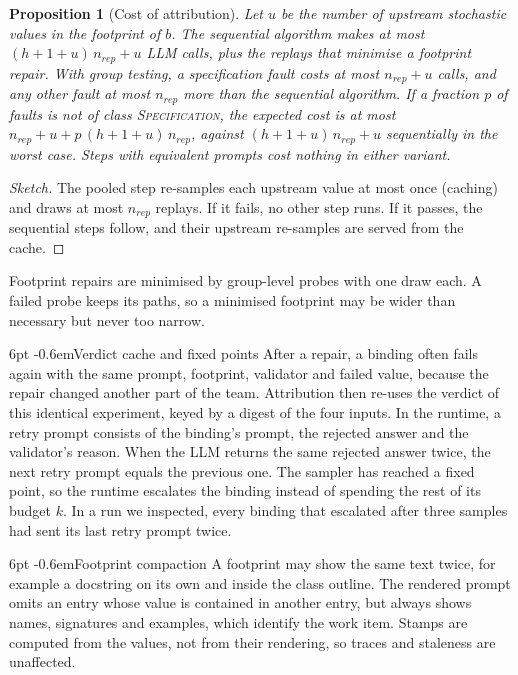 \documentclass[pdflatex,sn-mathphys-num]{sn-jnl}
\makeatletter
\theoremstyle{thmstyleone}%
\newtheorem{proposition}[theorem]{Proposition}%
\theoremstyle{thmstyletwo}%
\theoremstyle{thmstylethree}%
\renewcommand\paragraph{\@startsection{paragraph}{4}{\z@}%
  {6pt \@plus 2pt \@minus 1pt}{-0.6em}{\normalfont\normalsize\bfseries}}
\makeatother
\begin{document}
\begin{proposition}[Cost of attribution]\label{prop:attrcost}
Let $u$ be the number of upstream stochastic values in the footprint of $b$.
The sequential algorithm makes at most $(h+1+u)\,n_{\mathit{rep}}+u$ LLM calls,
plus the replays that minimise a footprint repair. With group testing, a
specification fault costs at most $n_{\mathit{rep}}+u$ calls, and any other
fault at most $n_{\mathit{rep}}$ more than the sequential algorithm. If a
fraction $p$ of faults is not of class \textsc{Specification}, the expected cost
is at most $n_{\mathit{rep}}+u+p\,(h+1+u)\,n_{\mathit{rep}}$, against
$(h+1+u)\,n_{\mathit{rep}}+u$ sequentially in the worst case. Steps with
equivalent prompts cost nothing in either variant.
\end{proposition}
\begin{proof}[Sketch]
The pooled step re-samples each upstream value at most once (caching) and draws
at most $n_{\mathit{rep}}$ replays. If it fails, no other step runs. If it
passes, the sequential steps follow, and their upstream re-samples are served
from the cache.
\end{proof}

Footprint repairs are minimised by group-level probes with one draw each. A
failed probe keeps its paths, so a minimised footprint may be wider than
necessary but never too narrow.

\paragraph{Verdict cache and fixed points} After a repair, a binding often fails
again with the same prompt, footprint, validator and failed value, because the
repair changed another part of the team. Attribution then re-uses the verdict
of this identical experiment, keyed by a digest of the four inputs. In the
runtime, a retry prompt consists of the binding's prompt, the rejected answer
and the validator's reason. When the LLM returns the same rejected answer
twice, the next retry prompt equals the previous one. The sampler has reached a
fixed point, so the runtime escalates the binding instead of spending the rest
of its budget $k$. In a run we inspected,
every binding that escalated after three samples had sent its last retry prompt twice.

\paragraph{Footprint compaction} A footprint may show the same text twice, for
example a docstring on its own and inside the class outline. The rendered
prompt omits an entry whose value is contained in another entry, but always
shows names, signatures and examples, which identify the work item. Stamps are
computed from the values, not from their rendering, so traces and staleness are
unaffected.
\end{document}
